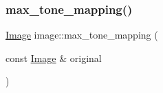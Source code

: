 \mbox{\label{namespaceimage_acad5a9459043f5ce5b565e771b0867f8}} 
\subsubsection{\texorpdfstring{max\_tone\_mapping()}{max\_tone\_mapping()}\hspace{0.1cm}{\footnotesize\ttfamily [2/2]}}
{\footnotesize\ttfamily \mbox{\hyperlink{namespaceimage_af3f0dcb372dbc1b38ba87aae9e2c780c}{Image}} image\+::max\+\_\+tone\+\_\+mapping (\begin{DoxyParamCaption}\item[{const \mbox{\hyperlink{namespaceimage_af3f0dcb372dbc1b38ba87aae9e2c780c}{Image}} \&}]{original }\end{DoxyParamCaption})}

